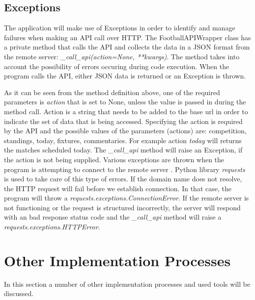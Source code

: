  \subsection{Exceptions}
The application will make use of Exceptions in order to identify and manage failures when making an API call over HTTP. The FootballAPIWrapper class has a private method that calls the API and collects the data in a JSON format from the remote server: \emph{\_call\_api(action=None, **kwargs)}. The method takes into account the possibility of errors occuring during code execution. When the program calls the API, either JSON data is returned or an Exception is thrown. 

As it can be seen from the method definition above, one of the required parameters is \emph{action} that is set to None, unless the value is passed in during the method call. Action is a string that needs to be added to the base url in order to indicate the set of data that is being accessed. Specifying the action is required by the API and the possible values of the parameters (actions) are: competition, standings, today, fixtures, commentaries. For example action \emph{today} will returns the matches scheduled today. The \emph{\_call\_api} method will raise an Exception, if the action is not being supplied. Various exceptions are thrown when the program is attempting to connect to the remote server \cite{article:httpRequestsExceptions}. Python library \emph{requests} is used to take care of this type of errors. \cite{documentation:PythonRequests} If the domain name does not resolve, the HTTP request will fail before we establish connection. In that case, the program will throw a \emph{requests.exceptions.ConnectionError}. If the remote server is not functioning or the request is structured incorrectly, the server will respond with an bad response status code and the \emph{\_call\_api} method will raise a \emph{requests.exceptions.HTTPError}.

\section{Other Implementation Processes}
In this section a number of other implementation processes and used tools will be discussed.

